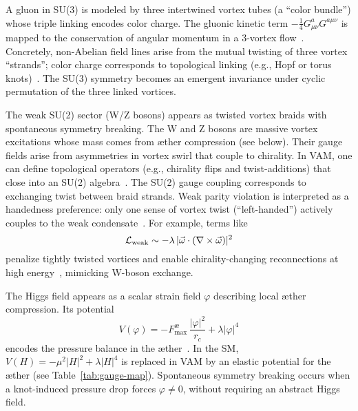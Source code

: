 \documentclass[a4paper,12pt]{article}
\begin{document}
A gluon in SU(3) is modeled by three intertwined vortex tubes (a ``color bundle'') whose triple linking encodes color charge. The gluonic kinetic term $-\tfrac{1}{4}G^a_{\mu\nu}G^{a\mu\nu}$ is mapped to the conservation of angular momentum in a 3-vortex flow~\cite{vam-lagrangian, vam-helicity}. Concretely, non-Abelian field lines arise from the mutual twisting of three vortex ``strands''; color charge corresponds to topological linking (e.g., Hopf or torus knots)~\cite{vam-helicity}. The SU(3) symmetry becomes an emergent invariance under cyclic permutation of the three linked vortices.

The weak SU(2) sector (W/Z bosons) appears as twisted vortex braids with spontaneous symmetry breaking. The W and Z bosons are massive vortex excitations whose mass comes from æther compression (see below). Their gauge fields arise from asymmetries in vortex swirl that couple to chirality. In VAM, one can define topological operators (e.g., chirality flips and twist-additions) that close into an SU(2) algebra~\cite{vam-lagrangian}. The SU(2) gauge coupling corresponds to exchanging twist between braid strands. Weak parity violation is interpreted as a handedness preference: only one sense of vortex twist (``left-handed'') actively couples to the weak condensate~\cite{vam-weak}. For example, terms like
\begin{equation}
    \mathcal{L}_{\rm weak} \sim -\lambda\,|\vec{\omega}\cdot(\nabla\times\vec{\omega})|^2
\end{equation}
penalize tightly twisted vortices and enable chirality-changing reconnections at high energy~\cite{vam-weak}, mimicking W-boson exchange.

The Higgs field appears as a scalar strain field $\varphi$ describing local æther compression. Its potential
\begin{equation}
    V(\varphi) = -F_{\text{max}}^{æ}\,\frac{|\varphi|^2}{r_c} + \lambda|\varphi|^4
\end{equation}
encodes the pressure balance in the æther~\cite{vam-lagrangian}. In the SM, $V(H)=-\mu^2|H|^2+\lambda|H|^4$ is replaced in VAM by an elastic potential for the æther (see Table~\ref{tab:gauge-map}). Spontaneous symmetry breaking occurs when a knot-induced pressure drop forces $\varphi\neq0$, without requiring an abstract Higgs field.
\end{document}
